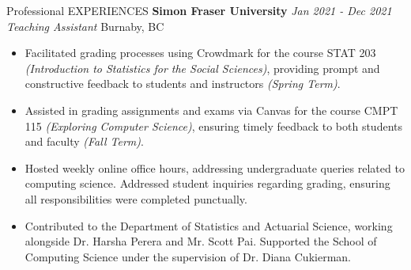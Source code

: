 \documentclass{resume} %
\begin{document}
\begin{rSection}{Professional EXPERIENCES}
{\bf Simon Fraser University} \hfill {\em Jan 2021 - Dec 2021} \\
{\textit{Teaching Assistant} \hfill {Burnaby, BC}}
\begin{itemize}
    \vspace{-0.2cm}\item Facilitated grading processes using Crowdmark for the course STAT 203 \textit{(Introduction to Statistics for the Social Sciences)}, providing prompt and constructive feedback to students and instructors \textit{(Spring Term)}.
    \vspace{-0.2cm}\item Assisted in grading assignments and exams via Canvas for the course CMPT 115 \textit{(Exploring Computer Science)}, ensuring timely feedback to both students and faculty \textit{(Fall Term)}.
    \vspace{-0.2cm}\item Hosted weekly online office hours, addressing undergraduate queries related to computing science. Addressed student inquiries regarding grading, ensuring all responsibilities were completed punctually.
    \vspace{-0.2cm}\item Contributed to the Department of Statistics and Actuarial Science, working alongside Dr. Harsha Perera and Mr. Scott Pai. Supported the School of Computing Science under the supervision of Dr. Diana Cukierman.
\end{itemize}

\end{rSection}
\end{document}

